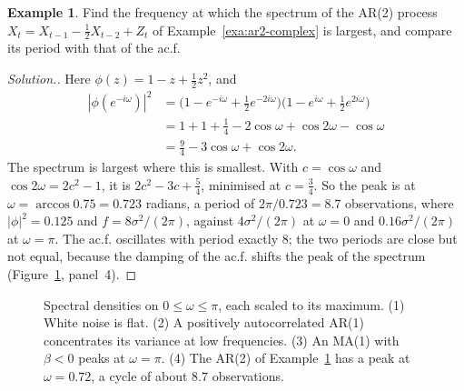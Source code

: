 \documentclass[11pt,a4paper]{article}
\theoremstyle{definition}
\newtheorem{exa}[thm]{Example}
\newenvironment{solution}
  {\renewcommand{\qedsymbol}{}\begin{proof}[\textit{Solution}.]}
  {\end{proof}}
\begin{document}
\begin{exa}\label{exa:ar2-spectrum}
Find the frequency at which the spectrum of the AR(2) process $X_t = X_{t-1} - \frac12X_{t-2} + Z_t$ of Example~\ref{exa:ar2-complex} is largest, and
compare its period with that of the ac.f.
\end{exa}

\begin{solution}
Here $\phi(z) = 1 - z + \frac12z^2$, and
\begin{align*}
|\phi(e^{-i\omega})|^2 &= \bigl(1 - e^{-i\omega} + \tfrac12e^{-2i\omega}\bigr)\bigl(1 - e^{i\omega} + \tfrac12e^{2i\omega}\bigr) \\
&= 1 + 1 + \tfrac14 - 2\cos\omega + \cos2\omega - \cos\omega \\
&= \tfrac94 - 3\cos\omega + \cos2\omega .
\end{align*}
The spectrum is largest where this is smallest. With $c = \cos\omega$ and $\cos2\omega = 2c^2 - 1$, it is $2c^2 - 3c + \frac54$, minimised at $c = \frac34$. So the
peak is at $\omega = \arccos0.75 = 0.723$ radians, a period of $2\pi/0.723 = 8.7$ observations, where $|\phi|^2 = 0.125$ and $f = 8\sigma^2/(2\pi)$, against
$4\sigma^2/(2\pi)$ at $\omega = 0$ and $0.16\sigma^2/(2\pi)$ at $\omega = \pi$. The ac.f. oscillates with period exactly $8$; the two periods are close but not
equal, because the damping of the ac.f. shifts the peak of the spectrum (Figure~\ref{fig:spectra}, panel~4).
\end{solution}

\begin{figure}[H]
\centering
{}
\caption{Spectral densities on $0 \le \omega \le \pi$, each scaled to its maximum. (1) White noise is flat. (2) A positively
autocorrelated AR(1) concentrates its variance at low frequencies. (3) An MA(1) with $\beta < 0$ peaks at $\omega = \pi$. (4) The AR(2)
of Example~\ref{exa:ar2-spectrum} has a peak at $\omega = 0.72$, a cycle of about $8.7$ observations.}
\label{fig:spectra}
\end{figure}
\end{document}
